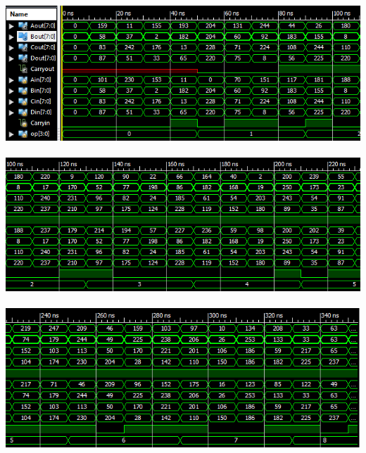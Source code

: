 \documentclass[12pt]{jreport}
\begin{document}
        \begin{center}
            \includegraphics[width=18cm]{apu_comb_1_1.png} \\　\\
            \includegraphics[width=18cm]{apu_comb_1_2.png} \\　\\
            \includegraphics[width=18cm]{apu_comb_1_3.png} \\　\\


\end{center}
\end{document}
